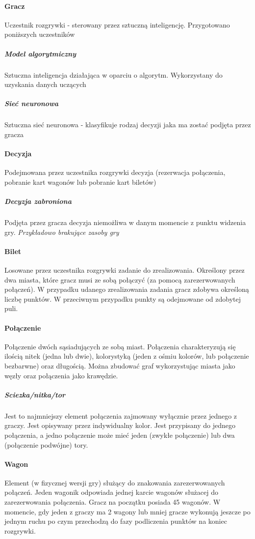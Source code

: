 \documentclass[12pt, oneside]{report}
\begin{document}
	\paragraph{Gracz}
	Uczestnik rozgrywki - sterowany przez sztuczną inteligencję. Przygotowano poniższych uczestników
	\subparagraph{Model algorytmiczny} Sztuczna inteligencja działająca w oparciu o algorytm. Wykorzystany do uzyskania danych uczących
	\subparagraph{Sieć neuronowa} Sztuczna sieć neuronowa - klasyfikuje rodzaj decyzji jaka ma zostać podjęta przez gracza
	\paragraph{Decyzja}
	Podejmowana przez uczestnika rozgrywki decyzja (rezerwacja połączenia, pobranie kart wagonów lub pobranie kart biletów)
	\subparagraph{Decyzja zabroniona}
	Podjęta przez gracza decyzja niemożliwa w danym momencie z punktu widzenia gry. \textit{Przykładowo brakujące zasoby gry}
	\paragraph{Bilet}
	\label{dictionary:bilet}
	Losowane przez uczestnika rozgrywki zadanie do zrealizowania. Określony przez dwa miasta, które gracz musi ze sobą połączyć (za pomocą zarezerwowanych połączeń). W przypadku udanego zrealizowania zadania gracz zdobywa określoną liczbę punktów. W przeciwnym przypadku punkty są odejmowane od zdobytej puli.
	\paragraph{Połączenie}
	Połączenie dwóch sąsiadujących ze sobą miast. Połączenia charakteryzują się ilością nitek (jedna lub dwie), kolorystyką (jeden z ośmiu kolorów, lub połączenie bezbarwne) oraz długością. Można zbudować graf wykorzystując miasta jako węzły oraz połączenia jako krawędzie.
	\subparagraph{Sciezka/nitka/tor} 
	Jest to najmniejszy element połączenia zajmowany wyłącznie przez jednego z graczy. Jest opisywany przez indywidualny kolor. Jest przypisany do jednego połączenia, a jedno połączenie może mieć jeden (zwykłe połączenie) lub dwa (połączenie podwójne) tory.
	\paragraph{Wagon} Element (w fizycznej wersji gry) służący do znakowania zarezerwowanych połączeń. Jeden wagonik odpowiada jednej karcie wagonów służacej do zarezerwowania połączenia. Gracz na początku posiada 45 wagonów. W momencie, gdy jeden z graczy ma 2 wagony lub mniej gracze wykonują jeszcze po jednym ruchu po czym przechodzą do fazy podliczenia punktów na koniec rozgrywki.
\end{document}
